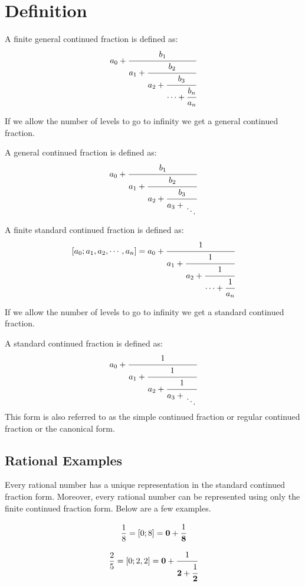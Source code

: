 \documentclass[a4paper]{article}
\begin{document}
\section{Definition}

\begin{definition}\label{def_finite_gen_c_fract}
A finite general continued fraction is defined as:
$$ 
a_0 + 
\cfrac{b_1}{a_1+\cfrac{b_2}{a_2 +\cfrac{b_3}{\cdots + \cfrac{b_n}{a_n} }}}
$$
\end{definition}

If we allow the number of levels to go to infinity we get a general continued fraction. 

\begin{definition}\label{def_gen_c_fract}
A general continued fraction is defined as:
$$ 
a_0 + 
\cfrac{b_1}{a_1+\cfrac{b_2}{a_2 +\cfrac{b_3}{a_3 +  
\CFDots}}}
$$
\end{definition}

\begin{definition}\label{def_finite_c_fract}
A finite standard continued fraction is defined as:
$$
[a_0;a_1, a_2, \cdots, a_n] = a_0 + 
\cfrac{1}{a_1+\cfrac{1}{a_2 +\cfrac{1}{\cdots + \cfrac{1}{a_n}}}}
$$
\end{definition}

If we allow the number of levels to go to infinity we get a standard continued fraction. 

\begin{definition}\label{def_c_fract}
A standard continued fraction is defined as:
$$
a_0 + 
\cfrac{1}{a_1+\cfrac{1}{a_2 +\cfrac{1}{a_3 + \CFDots}}}
$$
This form is also referred to as the simple continued fraction or regular continued fraction or the canonical form.
\end{definition}

\subsection{Rational Examples}
Every rational number has a unique representation in the standard continued fraction form. Moreover, every rational number can be represented using only the finite continued fraction form. Below are a few examples. 

\begin{equation*}
\frac{1}{8} = [0;8] = \textbf{0} + \cfrac{1}{\textbf{8}}
\end{equation*}

\begin{equation*}
\frac{2}{5} = [0;2,2] = \textbf{0} + \cfrac{1}{\textbf{2} +\cfrac{1}{\textbf{2}}}
\end{equation*}
\end{document}

